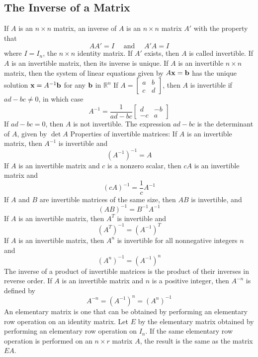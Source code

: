 \documentclass{article}
\begin{document}
       \subsection{The Inverse of a Matrix}
       \begin{outline}
           \1 If $A$ is an \(n\times n\) matrix, an inverse of $A$ is an \(n\times n\) matrix \(A'\) with the property that \[AA'=I\quad\text{ and }\quad A'A=I\]  where \(I=I_n\), the \(n\times n\) identity matrix. If \(A'\) exists, then \(A\) is called invertible. 
           \1 If $A$ is an invertible matrix, then its inverse is unique. 
           \1 If \(A\) is an invertible \(n\times n\) matrix, then the system of linear equations given by \(A\vb x=\vb b\) has the unique solution \(\vb x=A^{-1}\vb b\) for any \(\vb b\) in \(\mathbb R^n\)
           \1 If \(A=\begin{bmatrix}
               a & b\\ c& d
           \end{bmatrix}\), then \(A\) is invertible if \(ad-bc\neq 0\), in which case \[A^{-1}=\dfrac{1}{ad-bc}\begin{bmatrix}
               d & -b \\ -c & a
           \end{bmatrix}\] If \(ad-bc=0\), then \(A\) is not invertible. 
           \1 The expression \(ad-bc\) is the determinant of $A$, given by \(\det A\)
           \1 Properties of invertible matrices: 
                \2 If \(A\) is an invertible matrix, then \(A^{-1}\) is invertible and \[(A^{-1})^{-1}=A\]
                \2 If $A$ is an invertible matrix and $c$ is a nonzero scalar, then \(cA\) is an invertible matrix and \[(cA)^{-1}=\dfrac{1}{c}A^{-1}\]
                \2 If \(A\) and \(B\) are invertible matrices of the same size, then \(AB\) is invertible, and \[(AB)^{-1}=B^{-1}A^{-1}\]
                \2 If \(A\) is an invertible matrix, then \(A^T\) is invertible and \[(A^T)^{-1}=(A^{-1})^T\]
                \2 If $A$ is an invertible matrix, then \(A^n\) is invertible for all nonnegative integers $n$ and \[(A^n)^{-1}=(A^{-1})^n\]
            \1 The inverse of a product of invertible matrices is the product of their inverses in reverse order. 
            \1 If $A$ is an invertible matrix and \(n\) is a positive integer, then \(A^{-n}\) is defined by \[A^{-n}=(A^{-1})^n=(A^n)^{-1}\]
            \1 An elementary matrix is one that can be obtained by performing an elementary row operation on an identity matrix. 
            \1 Let \(E\)  by the elementary matrix obtained by performing an elementary row operation on \(I_n\). If the same elementary row operation is performed on an \(n\times r\) matrix $A$, the result is the same as the matrix \(EA\). 

\end{outline}
\end{document}
